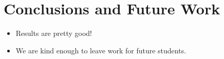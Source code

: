 \chapter{Conclusions and Future Work}

\begin{itemize}
\item{Results are pretty good!}
\item{We are kind enough to leave work for future students.}
\end{itemize}

